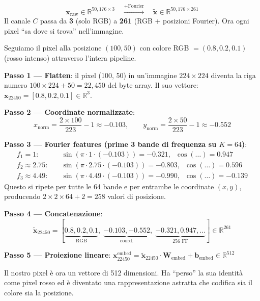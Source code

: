 \documentclass[12pt,a4paper]{article}
\begin{document}
\begin{formulabox}
\[
    \mathbf{x}_{\text{raw}} \in \mathbb{R}^{50{,}176 \times 3} \quad \xrightarrow{\text{+Fourier}} \quad \tilde{\mathbf{x}} \in \mathbb{R}^{50{,}176 \times 261}
\]
Il canale $C$ passa da \textbf{3} (solo RGB) a \textbf{261} (RGB + posizioni Fourier). Ora ogni pixel ``sa dove si trova'' nell'immagine.
\end{formulabox}

\begin{examplebox}
Seguiamo il pixel alla posizione $(100, 50)$ con colore RGB $= (0.8, 0.2, 0.1)$ (rosso intenso) attraverso l'intera pipeline.

\textbf{Passo 1 --- Flatten}: il pixel (100, 50) in un'immagine $224 \times 224$ diventa la riga numero $100 \times 224 + 50 = 22{,}450$ del byte array. Il suo vettore: $\mathbf{x}_{22450} = [0.8, 0.2, 0.1] \in \mathbb{R}^3$.

\textbf{Passo 2 --- Coordinate normalizzate}:
\[
x_{\text{norm}} = \frac{2 \times 100}{223} - 1 \approx -0.103, \qquad y_{\text{norm}} = \frac{2 \times 50}{223} - 1 \approx -0.552
\]

\textbf{Passo 3 --- Fourier features (prime 3 bande di frequenza su $K{=}64$)}:
\begin{align*}
f_1 {=} 1: &\quad \sin(\pi \!\cdot\! 1 \!\cdot\! (-0.103)) = -0.321,\;\; \cos(\ldots) = 0.947 \\
f_2 {\approx} 2.75: &\quad \sin(\pi \!\cdot\! 2.75 \!\cdot\! (-0.103)) = -0.803,\;\; \cos(\ldots) = 0.596 \\
f_3 {\approx} 4.49: &\quad \sin(\pi \!\cdot\! 4.49 \!\cdot\! (-0.103)) = -0.990,\;\; \cos(\ldots) = -0.139
\end{align*}
Questo si ripete per tutte le 64 bande e per entrambe le coordinate $(x, y)$, producendo $2 \times 2 \times 64 + 2 = 258$ valori di posizione.

\textbf{Passo 4 --- Concatenazione}:
\[
\tilde{\mathbf{x}}_{22450} = [\underbrace{0.8, 0.2, 0.1}_{\text{RGB}},\; \underbrace{-0.103, -0.552}_{\text{coord.}},\; \underbrace{-0.321, 0.947, \ldots}_{\text{256 FF}}] \in \mathbb{R}^{261}
\]

\textbf{Passo 5 --- Proiezione lineare}: $\mathbf{x}_{22450}^{\text{embed}} = \tilde{\mathbf{x}}_{22450} \cdot \mathbf{W}_{\text{embed}} + \mathbf{b}_{\text{embed}} \in \mathbb{R}^{512}$

Il nostro pixel \`e ora un vettore di 512 dimensioni. Ha ``perso'' la sua identit\`a come pixel rosso ed \`e diventato una rappresentazione astratta che codifica sia il colore sia la posizione.


\end{examplebox}
\end{document}
